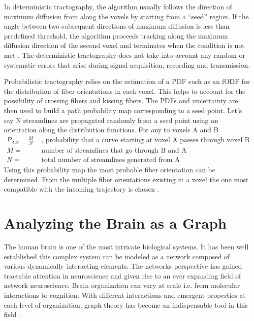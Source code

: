 \documentclass[msthesis.tex]{subfiles}
\begin{document}
In deterministic tractography, the algorithm usually follows the direction of maximum diffusion from along the voxels by starting from a “seed” region. If the angle between two subsequent directions of maximum diffusion is less than predefined threshold, the algorithm proceeds tracking along the maximum diffusion direction of the second voxel and terminates when the condition is not met \citep{descoteaux2008deterministic}. The deterministic tractography does not take into account any random or systematic errors that arise during signal acquisition, recording and transmission.

Probabilistic tractography relies on the estimation of a \gls{PDF} such as an \gls{fODF} for the distribution of fiber orientations in each voxel. This helps to account for the possibility of crossing fibers and kissing fibers. The \gls{PDF}s and uncertainty are then used to build a path probability map corresponding to a seed point. Let's say N streamlines are propagated randomly from a seed point using an orientation along the distribution functions. For any to voxels A and B 
\begin{align*}
P_{AB}= \frac{M}{N} & \textrm{ , probability that a curve starting at voxel A passes through voxel B} \\
M = & \textrm{ number of streamlines that go through B and A} \\
N = &\textrm{ total number of streamlines generated from A}
\end{align*}
Using this probability map the most probable fiber orientation can be determined. From the multiple fiber orientations existing in a voxel the one most compatible with the incoming trajectory is chosen \citep{behrens2003non}.
\section[Brain Graph Representation]{Analyzing the Brain as a Graph}
\label{sec:braingraph}
The human brain is one of the most intricate biological systems. It has been well established this complex system can be modeled as a network composed of various dynamically interacting elements. The networks perspective has gained tractable attention in neuroscience and given rise to an ever expanding field of network neuroscience. Brain organization can vary at scale i.e. from molecular interactions to cognition. With different interactions and emergent properties at each level of organization, graph theory has become an indispensable tool in this field \citep{sporns2018graph}. 
\end{document}
